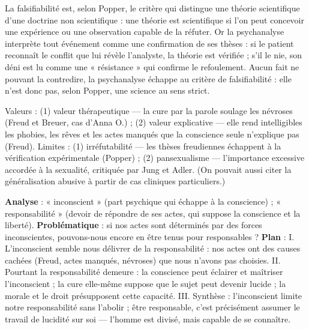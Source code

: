 \documentclass[11pt]{article}
\begin{document}
\begin{corrige}[Exercice 1]
La falsifiabilité est, selon Popper, le critère qui distingue une théorie scientifique d'une doctrine non scientifique : une théorie est scientifique si l'on peut concevoir une expérience ou une observation capable de la réfuter. Or la psychanalyse interprète tout événement comme une confirmation de ses thèses : si le patient reconnaît le conflit que lui révèle l'analyste, la théorie est vérifiée ; s'il le nie, son déni est lu comme une « résistance » qui confirme le refoulement. Aucun fait ne pouvant la contredire, la psychanalyse échappe au critère de falsifiabilité : elle n'est donc pas, selon Popper, une science au sens strict.
\end{corrige}

\begin{corrige}[Exercice 2]
Valeurs : (1) valeur thérapeutique — la cure par la parole soulage les névroses (Freud et Breuer, cas d'Anna O.) ; (2) valeur explicative — elle rend intelligibles les phobies, les rêves et les actes manqués que la conscience seule n'explique pas (Freud). Limites : (1) irréfutabilité — les thèses freudiennes échappent à la vérification expérimentale (Popper) ; (2) pansexualisme — l'importance excessive accordée à la sexualité, critiquée par Jung et Adler. (On pouvait aussi citer la généralisation abusive à partir de cas cliniques particuliers.)
\end{corrige}

\begin{corrige}[Exercice 3]
\textbf{Analyse} : « inconscient » (part psychique qui échappe à la conscience) ; « responsabilité » (devoir de répondre de ses actes, qui suppose la conscience et la liberté). \textbf{Problématique} : si nos actes sont déterminés par des forces inconscientes, pouvons-nous encore en être tenus pour responsables ? \textbf{Plan} : I. L'inconscient semble nous délivrer de la responsabilité : nos actes ont des causes cachées (Freud, actes manqués, névroses) que nous n'avons pas choisies. II. Pourtant la responsabilité demeure : la conscience peut éclairer et maîtriser l'inconscient ; la cure elle-même suppose que le sujet peut devenir lucide ; la morale et le droit présupposent cette capacité. III. Synthèse : l'inconscient limite notre responsabilité sans l'abolir ; être responsable, c'est précisément assumer le travail de lucidité sur soi — l'homme est divisé, mais capable de se connaître.
\end{corrige}

\newpage
\end{document}
